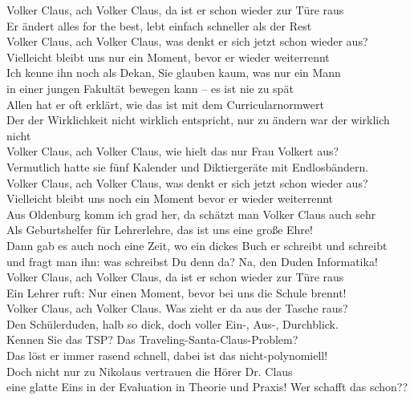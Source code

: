 \documentclass[11pt,a5paper]{article}
\begin{document}
			Volker Claus, ach Volker Claus, da ist er schon wieder zur Türe raus \\
			Er ändert alles for the best, lebt einfach schneller als der Rest \\
			Volker Claus, ach Volker Claus, was denkt er sich jetzt schon wieder aus? \\
			Vielleicht bleibt uns nur ein Moment, bevor er wieder weiterrennt \\
			
			Ich kenne ihn noch als Dekan, Sie glauben kaum, was nur ein Mann \\
			in einer jungen Fakultät bewegen kann – es ist nie zu spät \\
			Allen hat er oft erklärt, wie das ist mit dem Curricularnormwert \\
			Der der Wirklichkeit nicht wirklich entspricht, nur zu ändern war der wirklich nicht \\
			
			Volker Claus, ach Volker Claus, wie hielt das nur Frau Volkert aus? \\
			Vermutlich hatte sie fünf Kalender und Diktiergeräte mit Endlosbändern. \\
			Volker Claus, ach Volker Claus, was denkt er sich jetzt schon wieder aus? \\
			Vielleicht bleibt uns noch ein Moment bevor er wieder weiterrennt \\
			
			Aus Oldenburg komm ich grad her, da schätzt man Volker Claus auch sehr \\
			Als Geburtshelfer für Lehrerlehre, das ist uns eine große Ehre! \\
			Dann gab es auch noch eine Zeit, wo ein dickes Buch er schreibt und schreibt \\
			und fragt man ihn: was schreibst Du denn da? \glqq Na, den Duden Informatika!\grqq \\
			
			Volker Claus, ach Volker Claus, da ist er schon wieder zur Türe raus \\
			Ein Lehrer ruft: \glqq Nur einen Moment, bevor bei uns die Schule brennt!\grqq \\
			Volker Claus, ach Volker Claus. Was zieht er da aus der Tasche raus? \\
			Den Schülerduden, halb so dick, doch voller Ein-, Aus-, Durchblick. \\
			
			Kennen Sie das TSP? Das Traveling-Santa-Claus-Problem? \\
			Das löst er immer rasend schnell, dabei ist das nicht-polynomiell! \\
			Doch nicht nur zu Nikolaus vertrauen die Hörer Dr. Claus \\
			eine glatte Eins in der Evaluation in Theorie und Praxis! Wer schafft das schon?? \\
			
\end{document}
